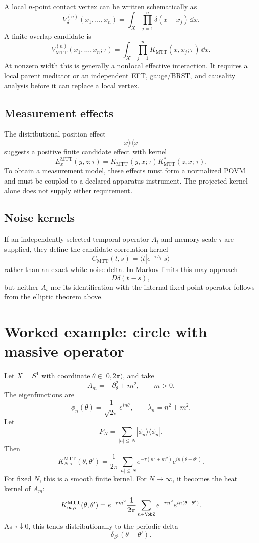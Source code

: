 \documentclass[11pt]{article}
\begin{document}
A local \(n\)-point contact vertex can be written schematically as
\[
        V_\delta^{(n)}(x_1,\ldots,x_n)
        =
        \int_X\prod_{j=1}^n \delta(x-x_j)\,\dd x.
\]
A finite-overlap candidate is
\[
        V_{\mathrm{MTT}}^{(n)}(x_1,\ldots,x_n;\tau)
        =
        \int_X\prod_{j=1}^n K_{\mathrm{MTT}}(x,x_j;\tau)\,\dd x.
\]
At nonzero width this is generally a nonlocal effective interaction.  It
requires a local parent mediator or an independent EFT, gauge/BRST, and
causality analysis before it can replace a local vertex.

\subsection{Measurement effects}

The distributional position effect
\[
        |x\rangle\langle x|
\]
suggests a positive finite candidate effect with kernel
\[
        E_x^{\mathrm{MTT}}(y,z;\tau)
        =
        K_{\mathrm{MTT}}(y,x;\tau)K_{\mathrm{MTT}}^\ast(z,x;\tau).
\]
To obtain a measurement model, these effects must form a normalized POVM and
must be coupled to a declared apparatus instrument.  The projected kernel
alone does not supply either requirement.

\subsection{Noise kernels}

If an independently selected temporal operator \(A_t\) and memory scale
\(\tau\) are supplied, they define the candidate correlation kernel
\[
        C_{\mathrm{MTT}}(t,s)
        =
        \langle t|e^{-\tau A_t}|s\rangle
\]
rather than an exact white-noise delta. In Markov limits this may approach
\[
        D\delta(t-s),
\]
but neither \(A_t\) nor its identification with the internal fixed-point
operator follows from the elliptic theorem above.

\section{Worked example: circle with massive operator}

Let \(X=S^1\) with coordinate \(\theta\in[0,2\pi)\), and take
\[
        A_m=-\partial_\theta^2+m^2,\qquad m>0.
\]
The eigenfunctions are
\[
        \phi_n(\theta)=\frac{1}{\sqrt{2\pi}}e^{in\theta},
        \qquad
        \lambda_n=n^2+m^2.
\]
Let
\[
        P_N=\sum_{|n|\le N}|\phi_n\rangle\langle\phi_n|.
\]
Then
\[
        K_{N,\tau}^{\mathrm{MTT}}(\theta,\theta')
        =
        \frac{1}{2\pi}
        \sum_{|n|\le N}
        e^{-\tau(n^2+m^2)}e^{in(\theta-\theta')}.
\]
For fixed \(N\), this is a smooth finite kernel. For \(N\to\infty\), it becomes the heat
kernel of \(A_m\):
\[
        K_{\infty,\tau}^{\mathrm{MTT}}(\theta,\theta')
        =
        e^{-\tau m^2}
        \frac{1}{2\pi}
        \sum_{n\in\bbZ}e^{-\tau n^2}e^{in(\theta-\theta')}.
\]
As \(\tau\downarrow0\), this tends distributionally to the periodic delta
\[
        \delta_{S^1}(\theta-\theta').
\]
\end{document}
